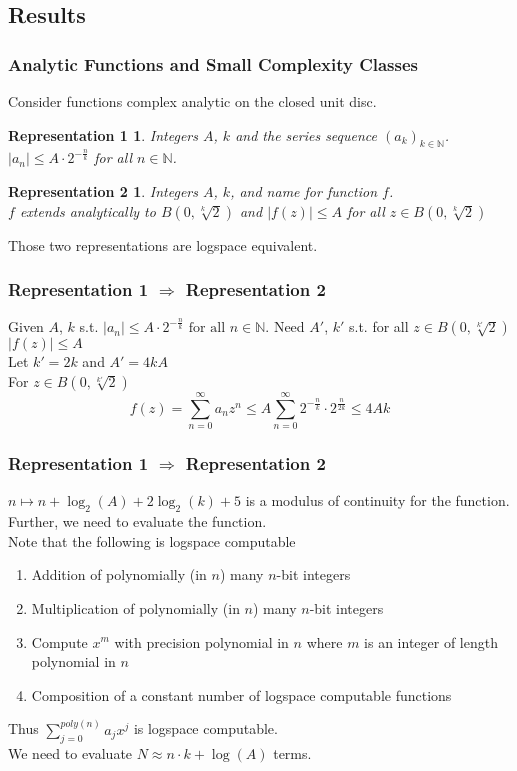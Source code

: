 \documentclass[xcolor=pdftex,dvipsnames,table]{beamer}
\newcommand{\N}{\ensuremath{\mathbb{N}}}
\newcommand{\abs}[1]{\left|#1\right|}
\newtheorem{representation1}{Representation 1}
\newtheorem{representation2}{Representation 2}
\begin{document}
\subsection*{Results}
\begin{frame}
\frametitle{Analytic Functions and Small Complexity Classes}
  Consider functions complex analytic on the closed unit disc.
\begin{representation1}
  Integers $A$, $k$ and the series sequence $(a_k)_{k \in \N}$.\\
  $\abs{a_n} \leq A \cdot 2^{-\frac{n}{k}}$ for all $n \in \N$.
\end{representation1}
\begin{representation2}
  Integers $A$, $k$, and name for function $f$.\\
  $f$ extends analytically to $B(0, \sqrt[k]{2})$ and $\abs{f(z)} \leq A$ for all $z \in B(0, \sqrt[k]{2})$
\end{representation2}
Those two representations are logspace equivalent.
\end{frame}
\begin{frame}
\frametitle{Representation 1 $\Rightarrow$ Representation 2}
Given $A$, $k$ s.t. 
  $\abs{a_n} \leq A \cdot 2^{-\frac{n}{k}} \text{ for all } n \in \N.$
Need $A'$, $k'$ s.t. for all $z \in B(0, \sqrt[k']{2})$
$\abs{f(z)} \leq A$\\
\vfill
\pause
Let $k' = 2k$ and $A' = 4kA$ \\
For $z \in B(0, \sqrt[k']{2})$
$$f(z) = \sum_{n=0}^\infty a_nz^n \leq A\sum_{n=0}^\infty 2^{-\frac{n}{k}} \cdot 2^{\frac{n}{2k}} \leq 4Ak$$
\end{frame}
\begin{frame}
\frametitle{Representation 1 $\Rightarrow$ Representation 2}
$n \mapsto n+\log_2(A)+2\log_2(k)+5$ is a modulus of continuity for the function.\\
\pause
Further, we need to evaluate the function.\\
Note that the following is logspace computable 
\begin{enumerate}
\item Addition of polynomially (in $n$) many $n$-bit integers
\item Multiplication of polynomially (in $n$) many $n$-bit integers
\item Compute $x^m$ with precision polynomial in $n$ where $m$ is an integer of length polynomial in $n$
 \item Composition of a constant number of logspace computable functions
\end{enumerate}
\pause
Thus $\sum_{j=0}^{poly(n)} a_jx^j$ is logspace computable.\\
We need to evaluate $N \approx n \cdot k + \log(A)$ terms.
\end{frame}
\end{document}
